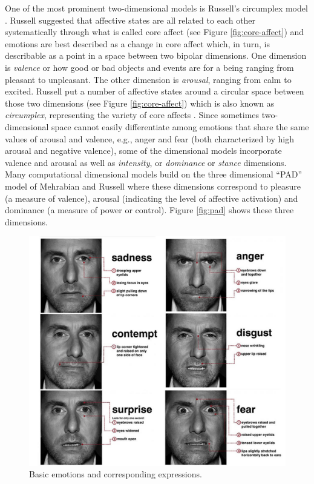 \documentclass[11pt]{article}
\begin{document}
One of the most prominent two-dimensional models is Russell's circumplex model
\cite{russell:circumplex-affect}. Russell suggested that affective states are
all related to each other systematically through what is called core affect
\cite{russell:circumplex-affect,russell:core-affect} (see Figure
\ref{fig:core-affect}) and emotions are best described as a change in core
affect which, in turn, is describable as a point in a space between two bipolar
dimensions. One dimension is \textit{valence} or how good or bad objects and
events are for a being ranging from pleasant to unpleasant. The other dimension
is \textit{arousal}, ranging from calm to excited. Russell put a number of
affective states around a circular space between those two dimensions (see
Figure \ref{fig:core-affect}) which is also known as \textit{circumplex},
representing the variety of core affects
\cite{russell:circumplex-affect,russell:core-affect}. Since sometimes
two-dimensional space cannot easily differentiate among emotions that share the
same values of arousal and valence, e.g., anger and fear (both characterized by
high arousal and negative valence), some of the dimensional models incorporate
valence and arousal as well as \textit{intensity}, or \textit{dominance} or
\textit{stance} dimensions. Many computational dimensional models build on the
three dimensional “PAD” model of Mehrabian and Russell
\cite{mehrabian-russell:pad} where these dimensions correspond to pleasure (a
measure of valence), arousal (indicating the level of affective activation) and
dominance (a measure of power or control). Figure \ref{fig:pad} shows these
three dimensions.

\begin{figure}[tbh]
  \center
  \includegraphics[width=.9\textwidth]{figure/basic-emotions.jpg}
  \caption{Basic emotions and corresponding expressions.}
  \label{fig:basic-emotions}
\end{figure}
\end{document}
